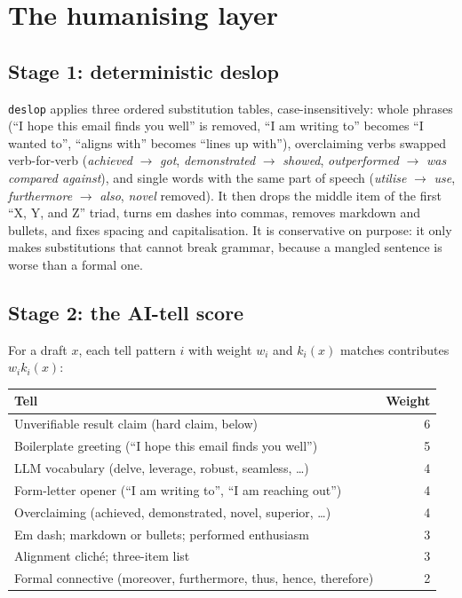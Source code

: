\documentclass[11pt,a4paper]{article}
\newcommand{\code}[1]{\texttt{#1}}
\begin{document}
\section{The humanising layer}\label{sec:humanize}

\subsection{Stage 1: deterministic deslop}
\code{deslop} applies three ordered substitution tables, case-insensitively: whole phrases
(``I hope this email finds you well'' is removed, ``I am writing to'' becomes ``I wanted to'',
``aligns with'' becomes ``lines up with''), overclaiming verbs swapped verb-for-verb
(\emph{achieved} $\to$ \emph{got}, \emph{demonstrated} $\to$ \emph{showed}, \emph{outperformed}
$\to$ \emph{was compared against}), and single words with the same part of speech
(\emph{utilise} $\to$ \emph{use}, \emph{furthermore} $\to$ \emph{also}, \emph{novel} removed). It
then drops the middle item of the first ``X, Y, and Z'' triad, turns em dashes into commas,
removes markdown and bullets, and fixes spacing and capitalisation. It is conservative on
purpose: it only makes substitutions that cannot break grammar, because a mangled sentence is
worse than a formal one.

\subsection{Stage 2: the AI-tell score}
For a draft $x$, each tell pattern $i$ with weight $w_i$ and $k_i(x)$ matches contributes
$w_i k_i(x)$:

\begin{center}
\begin{tabular}{@{}lr@{}}
\toprule
Tell & Weight \\
\midrule
Unverifiable result claim (hard claim, below) & 6 \\
Boilerplate greeting (``I hope this email finds you well'') & 5 \\
LLM vocabulary (delve, leverage, robust, seamless, \ldots) & 4 \\
Form-letter opener (``I am writing to'', ``I am reaching out'') & 4 \\
Overclaiming (achieved, demonstrated, novel, superior, \ldots) & 4 \\
Em dash; markdown or bullets; performed enthusiasm & 3 \\
Alignment clich\'e; three-item list & 3 \\
Formal connective (moreover, furthermore, thus, hence, therefore) & 2 \\
\bottomrule
\end{tabular}
\end{center}
\end{document}
